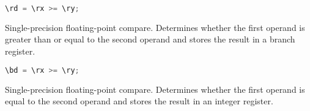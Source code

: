 \begin{lstlisting}[numbers=none, basicstyle=\ttfamily\footnotesize, language=C++]
\rd = \rx >= \ry;
\end{lstlisting}

Single-precision floating-point compare. Determines whether the first operand is greater than or equal to the second operand and stores
the result in a branch register.

\begin{lstlisting}[numbers=none, basicstyle=\ttfamily\footnotesize, language=C++]
\bd = \rx >= \ry;
\end{lstlisting}

%

%

Single-precision floating-point compare. Determines whether the first operand is equal to the second operand and stores
the result in an integer register.

